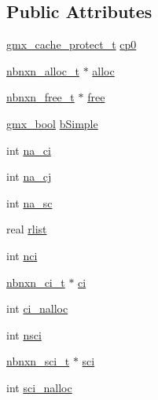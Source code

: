 \subsection*{\-Public \-Attributes}
\begin{DoxyCompactItemize}
\item 
\hyperlink{structgmx__cache__protect__t}{gmx\-\_\-cache\-\_\-protect\-\_\-t} \hyperlink{structnbnxn__pairlist__t_a4ca6ecd37629d7a655a0622ca14fe9c1}{cp0}
\item 
\hyperlink{share_2template_2gromacs_2types_2nbnxn__pairlist_8h_adb326a71f76686d6e0c17d6ff3a9405b}{nbnxn\-\_\-alloc\-\_\-t} $\ast$ \hyperlink{structnbnxn__pairlist__t_a409ecc121e6adfd8c02b831feae63c76}{alloc}
\item 
\hyperlink{share_2template_2gromacs_2types_2nbnxn__pairlist_8h_ab3befa5b0a53bd74a7047db01c6cf9da}{nbnxn\-\_\-free\-\_\-t} $\ast$ \hyperlink{structnbnxn__pairlist__t_aa1778495dc38b695ee9d58951e8a93c9}{free}
\item 
\hyperlink{include_2types_2simple_8h_a8fddad319f226e856400d190198d5151}{gmx\-\_\-bool} \hyperlink{structnbnxn__pairlist__t_a9ab421434f2bdf47f049e0da1f3e1fc8}{b\-Simple}
\item 
int \hyperlink{structnbnxn__pairlist__t_a51be2c53156aa7c3607ea39a8d2e83b8}{na\-\_\-ci}
\item 
int \hyperlink{structnbnxn__pairlist__t_a3c2c8e98d5c7766ecbfcc455412551e4}{na\-\_\-cj}
\item 
int \hyperlink{structnbnxn__pairlist__t_adc3106229f2a9de1a5b9582e88b7b7b4}{na\-\_\-sc}
\item 
real \hyperlink{structnbnxn__pairlist__t_a1217f7ce2cf8018b9efecbfb3e9d490a}{rlist}
\item 
int \hyperlink{structnbnxn__pairlist__t_a1d1f3d8c09c183a4b5b29d2ee3f56500}{nci}
\item 
\hyperlink{structnbnxn__ci__t}{nbnxn\-\_\-ci\-\_\-t} $\ast$ \hyperlink{structnbnxn__pairlist__t_af277d82ced1a2f413e2c6398e569f1d6}{ci}
\item 
int \hyperlink{structnbnxn__pairlist__t_a037a02fd67e2d4191e89e4b62235559b}{ci\-\_\-nalloc}
\item 
int \hyperlink{structnbnxn__pairlist__t_ae21e7ecb4e7774972528642eafcb8ac2}{nsci}
\item 
\hyperlink{structnbnxn__sci__t}{nbnxn\-\_\-sci\-\_\-t} $\ast$ \hyperlink{structnbnxn__pairlist__t_ae0bb2f89cbafa68d48d884ecaaa7bd7b}{sci}
\item 
int \hyperlink{structnbnxn__pairlist__t_ac2ea55e2c066c7f1dbf5f75e08f13fcd}{sci\-\_\-nalloc}

\end{DoxyCompactItemize}
